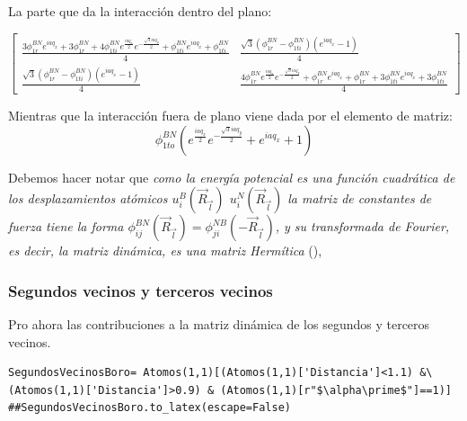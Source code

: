 \documentclass[12pt,a4paper]{article}
\begin{document}
La parte que da la interacción dentro del plano:

\begin{equation}
\label{eq:10}
\left[\begin{matrix}\frac{3 \phi^{BN}_{1r} e^{i a q_{x}} + 3 \phi^{BN}_{1r} + 4 \phi^{BN}_{1ti} e^{\frac{i a q_{x}}{2}} e^{- \frac{\sqrt{3} i a q_{y}}{2}} + \phi^{BN}_{1ti} e^{i a q_{x}} + \phi^{BN}_{1ti}}{4} & \frac{\sqrt{3} \left(\phi^{BN}_{1r} - \phi^{BN}_{1ti}\right) \left(e^{i a q_{x}} - 1\right)}{4}\\\frac{\sqrt{3} \left(\phi^{BN}_{1r} - \phi^{BN}_{1ti}\right) \left(e^{i a q_{x}} - 1\right)}{4} & \frac{4 \phi^{BN}_{1r} e^{\frac{i a q_{x}}{2}} e^{- \frac{\sqrt{3} i a q_{y}}{2}} + \phi^{BN}_{1r} e^{i a q_{x}} + \phi^{BN}_{1r} + 3 \phi^{BN}_{1ti} e^{i a q_{x}} + 3 \phi^{BN}_{1ti}}{4}\end{matrix}\right]
\end{equation}

Mientras que la interacción fuera de plano viene dada por el elemento de matriz:
\begin{equation}
\label{eq:12}
\phi^{BN}_{1to} \left(e^{\frac{i a q_{x}}{2}} e^{- \frac{\sqrt{3} i a q_{y}}{2}} + e^{i a q_{x}} + 1\right)
\end{equation}


Debemos hacer notar que \emph{como la energía potencial es una función cuadrática de los desplazamientos atómicos \(u^B_i(\vec R_{\vec l})\) \(u^N_i(\vec R_{\vec l})\) la matriz de constantes de fuerza tiene la forma \(\phi_{ij}^{BN}(\vec R_{\vec l})=\phi_{ji}^{NB}(-\vec R_{\vec l})\), y su transformada de Fourier, es decir, la matriz dinámica, es una matriz Hermítica} (\cite{falkovsky08_symmet_const_phonon_disper_graph}), 

\newpage
\eject \pdfpagewidth=210mm \pdfpageheight=297mm

\subsubsection{Segundos vecinos y terceros vecinos}
\label{sec:orgd069d7a}

Pro ahora las contribuciones a la matriz dinámica de los segundos y terceros vecinos.

\begin{verbatim}
SegundosVecinosBoro= Atomos(1,1)[(Atomos(1,1)['Distancia']<1.1) &\
(Atomos(1,1)['Distancia']>0.9) & (Atomos(1,1)[r"$\alpha\prime$"]==1)]
##SegundosVecinosBoro.to_latex(escape=False)
\end{verbatim}
\end{document}
